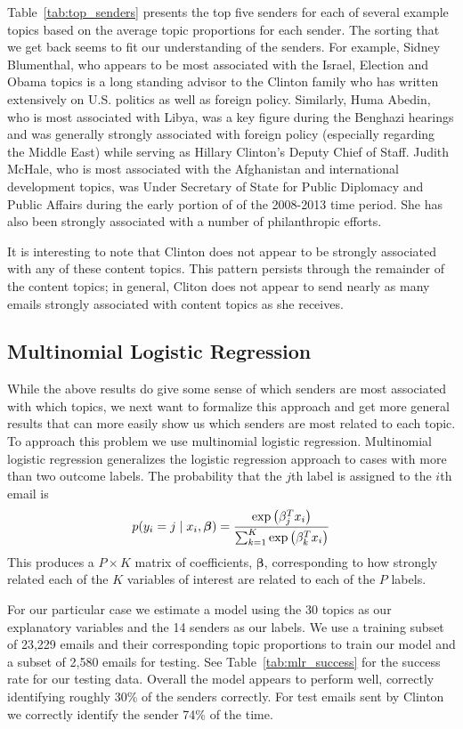\documentclass[12pt]{article}
\newcommand*{\cond}{\;\ifnum\currentgrouptype=16 \middle\fi|\;}
\newcommand*{\bmath}[1]{\boldsymbol{#1}}
\theoremstyle{definition}
\theoremstyle{algodesc}
\begin{document}
Table~\ref{tab:top_senders} presents the top five senders for each of several example topics based on the average topic proportions for each sender. The sorting that we get back seems to fit our understanding of the senders. For example, Sidney Blumenthal, who appears to be most associated with the Israel, Election and Obama topics is a long standing advisor to the Clinton family who has written extensively on U.S. politics as well as foreign policy. Similarly, Huma Abedin, who is most associated with Libya, was a key figure during the Benghazi hearings and was generally strongly associated with foreign policy (especially regarding the Middle East) while serving as Hillary Clinton's Deputy Chief of Staff. Judith McHale, who is most associated with the Afghanistan and international development topics, was Under Secretary of State for Public Diplomacy and Public Affairs during the early portion of of the 2008-2013 time period. She has also been strongly associated with a number of philanthropic efforts.

It is interesting to note that Clinton does not appear to be strongly associated with any of these content topics. This pattern persists through the remainder of the content topics; in general, Cliton does not appear to send nearly as many emails strongly associated with content topics as she receives.


\subsection{Multinomial Logistic Regression}
While the above results do give some sense of which senders are most associated with which topics, we next want to formalize this approach and get more general results that can more easily show us which senders are most related to each topic. To approach this problem we use multinomial logistic regression. Multinomial logistic regression generalizes the logistic regression approach to cases with more than two outcome labels. The probability that the $j$th label is assigned to the $i$th email is
\begin{equation} \label{eq:smax}
p(y_i = j \cond x_i, \bmath{\beta}) = \frac{\exp \left( \beta_j^T x_i \right)}{\sum_{k=1}^K \exp \left( \beta_k^T x_i \right)}
\end{equation}
This produces a $P \times K$ matrix of coefficients, $\bmath{\beta}$, corresponding to how strongly related each of the $K$ variables of interest are related to each of the $P$ labels.

For our particular case we estimate a model using the 30 topics as our explanatory variables and the 14 senders as our labels. We use a training subset of 23,229 emails and their corresponding topic proportions to train our model and a subset of 2,580 emails for testing. See Table~\ref{tab:mlr_success} for the success rate for our testing data. Overall the model appears to perform well, correctly identifying roughly 30\% of the senders correctly. For test emails sent by Clinton we correctly identify the sender 74\% of the time.
\end{document}
